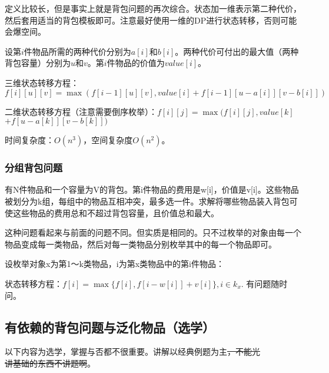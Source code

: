 定义比较长，但是事实上就是背包问题的再次综合。状态加一维表示第二种代价，然后套用适当的背包模板即可。注意最好使用一维的DP进行状态转移，否则可能会爆空间。


设第$i$件物品所需的两种代价分别为$a[i]$和$b[i]$。两种代价可付出的最大值（两种背包容量）分别为$u$和$v$。第$i$件物品的价值为$value[i]$。

三维状态转移方程：$f[i][u][v] = \max(f[i-1][u][v] , value[i] + f[i-1][u-a[i]][v-b[i]])$

二维状态转移方程（注意需要倒序枚举）：$f[i][j] = \max(f[i][j] , value[k]$ $+ f[u-a[k]][v-b[k]])$

时间复杂度：$O(n^3)$，空间复杂度$O(n^2)$。

\subsubsection{分组背包问题}
\begin{definition}[分组背包问题]有N件物品和一个容量为V的背包。第i件物品的费用是w[i]，价值是v[i]。这些物品被划分为k组，每组中的物品互相冲突，最多选一件。求解将哪些物品装入背包可使这些物品的费用总和不超过背包容量，且价值总和最大。\end{definition}

这种问题看起来与前面的问题不同。但实质是相同的。只不过枚举的对象由每一个物品变成每一类物品，然后对每一类物品分别枚举其中的每一个物品即可。

设枚举对象x为第1～k类物品，i为第x类物品中的第i件物品：

状态转移方程：$f[i]=\max\{f[i],f[i-w[i]]+v[i]\},i\in k_x.$
有问题随时问。
\note

\newpage
\subsection{有依赖的背包问题与泛化物品（选学）}
以下内容为选学，掌握与否都不很重要。讲解以经典例题为主\sout{，不能光\\讲基础的东西不讲题啊}。
